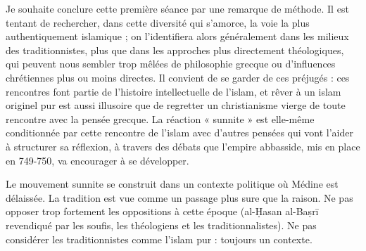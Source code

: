 Je souhaite conclure cette première séance par une remarque de méthode.
Il est tentant de rechercher, dans cette diversité qui s'amorce, la voie
la plus authentiquement islamique ; on l'identifiera alors généralement
dans les milieux des traditionnistes, plus que dans les approches plus
directement théologiques, qui peuvent nous sembler trop mêlées de
philosophie grecque ou d'influences chrétiennes plus ou moins directes.
Il convient de se garder de ces préjugés : ces rencontres font partie de
l'histoire intellectuelle de l'islam, et rêver à un islam originel pur
est aussi illusoire que de regretter un christianisme vierge de toute
rencontre avec la pensée grecque. La réaction « sunnite » est elle-même
conditionnée par cette rencontre de l'islam avec d'autres pensées qui
vont l'aider à structurer sa réflexion, à travers des débats que
l'empire abbasside, mis en place en 749-750, va encourager à se
développer.
\begin{Synthesis}
Le mouvement sunnite se construit dans un contexte politique où Médine est délaissée. La tradition est vue comme un passage plus sure que la raison. Ne pas opposer trop fortement les oppositions à cette époque (al-Ḥasan al-Baṣrī revendiqué par les soufis, les théologiens et les traditionnalistes). Ne pas considérer les traditionnistes comme l'islam pur : toujours un contexte.
\end{Synthesis}


